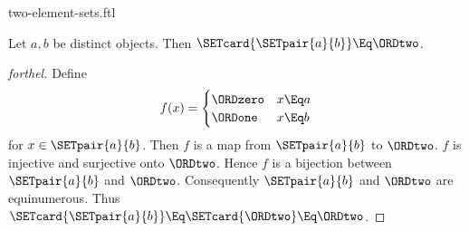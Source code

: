 \documentclass{stex}
\begin{document}
\begin{smodule}{two-element-sets.ftl}

\begin{proposition}[forthel]
  Let $a, b$ be distinct objects.
  Then $\SETcard{\SETpair{a}{b}} \Eq \ORDtwo$.
\end{proposition}
\begin{proof}[forthel]
  Define \[ f(x) =
    \begin{cases}
      \ORDzero & x \Eq a
      \\
      \ORDone & x \Eq b
    \end{cases} \]
  for $x \in \SETpair{a}{b}$.
  Then $f$ is a map from $\SETpair{a}{b}$ to $\ORDtwo$.
  $f$ is injective and surjective onto $\ORDtwo$.
  Hence $f$ is a bijection between $\SETpair{a}{b}$ and $\ORDtwo$.
  Consequently $\SETpair{a}{b}$ and $\ORDtwo$ are equinumerous.
  Thus $\SETcard{\SETpair{a}{b}} \Eq \SETcard{\ORDtwo} \Eq \ORDtwo$.
\end{proof}
\end{smodule}
\end{document}
